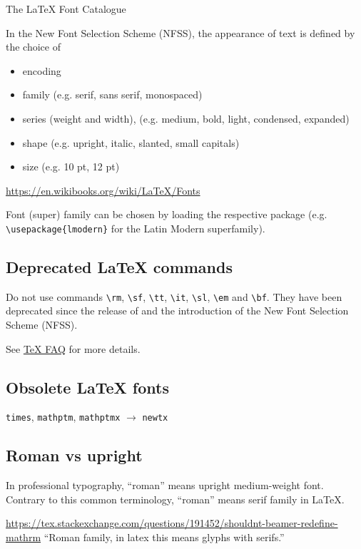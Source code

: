 \documentclass[12pt,a4paper]{article}
\begin{document}
The \LaTeX{} Font Catalogue~\cite{latex-fonts}

In the New Font Selection Scheme (NFSS), the appearance of text is defined by the choice of
\begin{itemize}
\item encoding
\item family (e.g. serif, sans serif, monospaced)
\item series (weight and width), (e.g. medium, bold, light, condensed, expanded)
\item shape (e.g. upright, italic, slanted, small capitals)
\item size (e.g. 10 pt, 12 pt)
\end{itemize}

\url{https://en.wikibooks.org/wiki/LaTeX/Fonts}

Font (super) family can be chosen by loading the respective package (e.g. \verb_\usepackage{lmodern}_ for the Latin Modern superfamily).

\subsection{Deprecated \LaTeX{} commands}

Do not use commands \verb_\rm_, \verb_\sf_, \verb_\tt_, \verb_\it_, \verb_\sl_, \verb_\em_ and \verb_\bf_.
They have been deprecated since the release of \LaTeXe{} and the introduction of the New Font Selection Scheme (NFSS).

See \href{https://texfaq.org/FAQ-2letterfontcmd}{\TeX{} FAQ} for more details.

\subsection{Obsolete \LaTeX{} fonts}

\texttt{times}, \texttt{math­ptm}, \texttt{mathptmx} $\to$ \texttt{newtx}

\subsection{Roman vs upright}

In professional typography, ``roman'' means upright medium-weight font.
Contrary to this common terminology, ``roman'' means serif family in \LaTeX{}.

\url{https://tex.stackexchange.com/questions/191452/shouldnt-beamer-redefine-mathrm}
``Roman family, in latex this means glyphs with serifs.''
\end{document}
